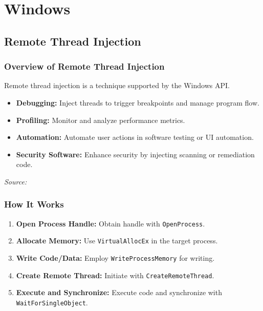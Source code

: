\section{Windows}

\subsection{Remote Thread Injection}


\begin{frame}
\frametitle{Overview of Remote Thread Injection}
    Remote thread injection is a technique supported by the Windows API.

    \begin{itemize}
        \item \textbf{Debugging:} Inject threads to trigger breakpoints and manage program flow.
        \item \textbf{Profiling:} Monitor and analyze performance metrics.
        \item \textbf{Automation:} Automate user actions in software testing or UI automation.
        \item \textbf{Security Software:} Enhance security by injecting scanning or remediation code.
    \end{itemize}
    \vspace{1em}
    \textit{Source:} \cite{chen2012}
\end{frame}

\begin{frame}
\frametitle{How It Works}
    \begin{enumerate}
        \item \textbf{Open Process Handle:} Obtain handle with \texttt{OpenProcess}.
        \item \textbf{Allocate Memory:} Use \texttt{VirtualAllocEx} in the target process.
        \item \textbf{Write Code/Data:} Employ \texttt{WriteProcessMemory} for writing.
        \item \textbf{Create Remote Thread:} Initiate with \texttt{CreateRemoteThread}.
        \item \textbf{Execute and Synchronize:} Execute code and synchronize with \texttt{WaitForSingleObject}.
    \end{enumerate}
\end{frame}


